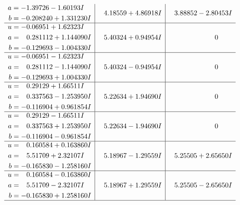 \documentclass[1p]{elsarticle_modified}
\theoremstyle{definition}
\begin{document}
$$\begin{array}{c|c|c}
\begin{aligned}
a &= -1.39726 - 1.60193 I \\
b &= -0.208240 + 1.331230 I\end{aligned}
 & \phantom{-}4.18559 + 4.86918 I & \phantom{-}3.88852 - 2.80453 I \\ \hline\begin{aligned}
u &= -0.06951 + 1.62323 I \\
a &= \phantom{-}0.281112 + 1.144090 I \\
b &= -0.129693 - 1.004330 I\end{aligned}
 & \phantom{-}5.40324 + 0.94954 I & \phantom{-0.000000 } 0 \\ \hline\begin{aligned}
u &= -0.06951 - 1.62323 I \\
a &= \phantom{-}0.281112 - 1.144090 I \\
b &= -0.129693 + 1.004330 I\end{aligned}
 & \phantom{-}5.40324 - 0.94954 I & \phantom{-0.000000 } 0 \\ \hline\begin{aligned}
u &= \phantom{-}0.29129 + 1.66511 I \\
a &= \phantom{-}0.337563 - 1.253950 I \\
b &= -0.116904 + 0.961854 I\end{aligned}
 & \phantom{-}5.22634 + 1.94690 I & \phantom{-0.000000 } 0 \\ \hline\begin{aligned}
u &= \phantom{-}0.29129 - 1.66511 I \\
a &= \phantom{-}0.337563 + 1.253950 I \\
b &= -0.116904 - 0.961854 I\end{aligned}
 & \phantom{-}5.22634 - 1.94690 I & \phantom{-0.000000 } 0 \\ \hline\begin{aligned}
u &= \phantom{-}0.160584 + 0.163860 I \\
a &= \phantom{-}5.51709 + 2.32107 I \\
b &= -0.165830 - 1.258160 I\end{aligned}
 & \phantom{-}5.18967 - 1.29559 I & \phantom{-}5.25505 + 2.65650 I \\ \hline\begin{aligned}
u &= \phantom{-}0.160584 - 0.163860 I \\
a &= \phantom{-}5.51709 - 2.32107 I \\
b &= -0.165830 + 1.258160 I\end{aligned}
 & \phantom{-}5.18967 + 1.29559 I & \phantom{-}5.25505 - 2.65650 I\\
 \hline 
 \end{array}$$\newpage
\end{document}
